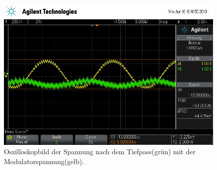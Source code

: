 \begin{figure}[h]
  \centering
  \includegraphics[width=.9\textwidth]{Oszi_Pics/hnachTiefpass.png}
  \caption{Oszilloskopbild der Spannung nach dem Tiefpass(grün) mit der Modulatorspannung(gelb).}
  \label{fig:hnachTiefpass}
\end{figure}
